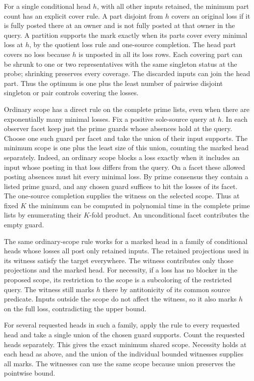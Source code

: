 For a single conditional head $h$,
with all other inputs retained, the
minimum part count has an explicit
cover rule. A part disjoint from $h$
covers an original loss if it is fully
posted there at an owner and is not
fully posted at that owner in the
query. A partition supports the mark
exactly when its parts cover every
minimal loss at $h$, by the quotient
loss rule and one-source completion.
The head part covers no loss because
$h$ is unposted in all its loss rows.
Each covering part can be shrunk to
one or two representatives with the
same singleton status at the probe;
shrinking preserves every coverage.
The discarded inputs can join the
head part. Thus the optimum is one
plus the least number of pairwise
disjoint singleton or pair controls
covering the losses.

Ordinary scope has a direct rule on the complete prime
lists, even when there are exponentially many minimal
losses. Fix a positive sole-source query at $h$.
In each observer facet keep just the prime guards whose
absences hold at the query. Choose one such guard per
facet and take the union of their input supports.
The minimum scope is one plus the least size of this
union, counting the marked head separately. Indeed, an
ordinary scope blocks a loss exactly when it includes
an input whose posting in that loss differs from the
query. On a facet these allowed posting absences must
hit every minimal loss. By prime consensus they contain
a listed prime guard, and any chosen guard suffices
to hit the losses of its facet. The one-source
completion supplies the witness on the selected scope.
Thus at fixed $K$ the minimum can be computed in
polynomial time in the complete prime lists by
enumerating their $K$-fold product. An unconditional
facet contributes the empty guard.

The same ordinary-scope rule works for a marked head
in a family of conditional heads whose losses all post
only retained inputs. The retained projections used
in its witness satisfy the target everywhere. The
witness contributes only those projections and the
marked head. For necessity, if a loss has no blocker
in the proposed scope,
its restriction to the scope is a subcoloring of
the restricted query. The witness still marks $h$
there by antitonicity of its common source
predicate. Inputs outside the scope do not affect
the witness, so it also marks $h$ on the full loss,
contradicting the upper bound.

For several requested heads in such a family, apply the
rule to every requested head and take a single union of the
chosen guard supports. Count the requested heads separately.
This gives the exact minimum shared scope. Necessity holds
at each head as above, and the union of the individual
bounded witnesses supplies all marks. The witnesses can use
the same scope because union preserves the pointwise bound.

